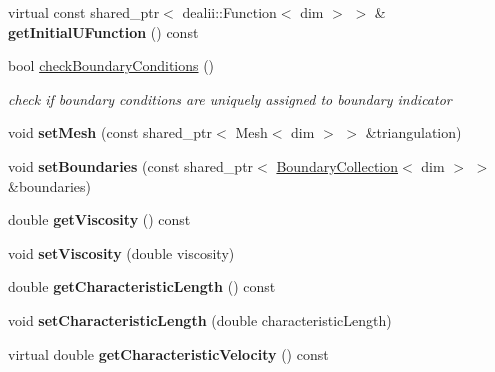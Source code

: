 \begin{DoxyCompactItemize}
\item 
\hypertarget{classnatrium_1_1ProblemDescription_aa2013706bd162531ad3cc6bc4b817fd4}{
virtual const shared\_\-ptr$<$ dealii::Function$<$ dim $>$ $>$ \& {\bfseries getInitialUFunction} () const }
\label{classnatrium_1_1ProblemDescription_aa2013706bd162531ad3cc6bc4b817fd4}

\item 
bool \hyperlink{classnatrium_1_1ProblemDescription_aed8ec93fcba6c0b78c04ef91b8703f7a}{checkBoundaryConditions} ()
\begin{DoxyCompactList}\small\item\em check if boundary conditions are uniquely assigned to boundary indicator \item\end{DoxyCompactList}\item 
\hypertarget{classnatrium_1_1ProblemDescription_a7c8fb092f2a3e80ba2a0dd3220cf1271}{
void {\bfseries setMesh} (const shared\_\-ptr$<$ Mesh$<$ dim $>$ $>$ \&triangulation)}
\label{classnatrium_1_1ProblemDescription_a7c8fb092f2a3e80ba2a0dd3220cf1271}

\item 
\hypertarget{classnatrium_1_1ProblemDescription_aadca2aac3953fa44bf9ce9cf43dc0417}{
void {\bfseries setBoundaries} (const shared\_\-ptr$<$ \hyperlink{classnatrium_1_1BoundaryCollection}{BoundaryCollection}$<$ dim $>$ $>$ \&boundaries)}
\label{classnatrium_1_1ProblemDescription_aadca2aac3953fa44bf9ce9cf43dc0417}

\item 
\hypertarget{classnatrium_1_1ProblemDescription_a582ecf296837d78a8a00fd598de38de2}{
double {\bfseries getViscosity} () const }
\label{classnatrium_1_1ProblemDescription_a582ecf296837d78a8a00fd598de38de2}

\item 
\hypertarget{classnatrium_1_1ProblemDescription_ad624cab941ab79af0422e5f7c735e8d8}{
void {\bfseries setViscosity} (double viscosity)}
\label{classnatrium_1_1ProblemDescription_ad624cab941ab79af0422e5f7c735e8d8}

\item 
\hypertarget{classnatrium_1_1ProblemDescription_ac424dbc36ad2d61d128f3656a8d6952d}{
double {\bfseries getCharacteristicLength} () const }
\label{classnatrium_1_1ProblemDescription_ac424dbc36ad2d61d128f3656a8d6952d}

\item 
\hypertarget{classnatrium_1_1ProblemDescription_adc48f96c34c6318d911bbc41582c202b}{
void {\bfseries setCharacteristicLength} (double characteristicLength)}
\label{classnatrium_1_1ProblemDescription_adc48f96c34c6318d911bbc41582c202b}

\item 
\hypertarget{classnatrium_1_1ProblemDescription_a3af2ccea3bfbb7d1aa39570579fcf937}{
virtual double {\bfseries getCharacteristicVelocity} () const }
\label{classnatrium_1_1ProblemDescription_a3af2ccea3bfbb7d1aa39570579fcf937}

\end{DoxyCompactItemize}
